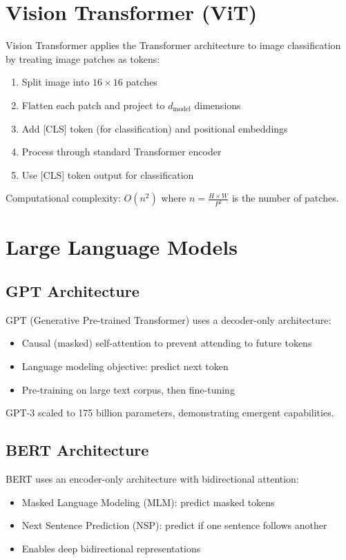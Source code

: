 \section{Vision Transformer (ViT)}

Vision Transformer applies the Transformer architecture to image classification by treating image patches as tokens:

\begin{enumerate}
    \item Split image into $16 \times 16$ patches
    \item Flatten each patch and project to $d_{\text{model}}$ dimensions
    \item Add [CLS] token (for classification) and positional embeddings
    \item Process through standard Transformer encoder
    \item Use [CLS] token output for classification
\end{enumerate}

Computational complexity: $O(n^2)$ where $n = \frac{H \times W}{P^2}$ is the number of patches.

\section{Large Language Models}

\subsection{GPT Architecture}

GPT (Generative Pre-trained Transformer) uses a decoder-only architecture:
\begin{itemize}
    \item Causal (masked) self-attention to prevent attending to future tokens
    \item Language modeling objective: predict next token
    \item Pre-training on large text corpus, then fine-tuning
\end{itemize}

GPT-3 scaled to 175 billion parameters, demonstrating emergent capabilities.

\subsection{BERT Architecture}

BERT uses an encoder-only architecture with bidirectional attention:
\begin{itemize}
    \item Masked Language Modeling (MLM): predict masked tokens
    \item Next Sentence Prediction (NSP): predict if one sentence follows another
    \item Enables deep bidirectional representations
\end{itemize}

